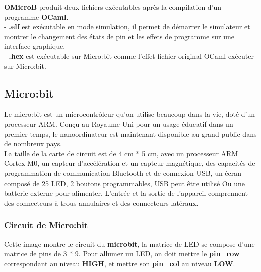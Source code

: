 \documentclass[14px]{article}
\begin{document}
	\textbf{OMicroB} produit deux fichiers exécutables après la compilation d'un programme \textbf{OCaml}.\\
	- \textbf{.elf} est exécutable en mode simulation, il permet de démarrer le simulateur et montrer le changement des états de pin et les effets de programme sur une interface graphique.\\
	- \textbf{.hex} est exécutable sur Micro:bit comme l'effet fichier original OCaml exécuter sur Micro:bit.
	
	\subsection{Micro:bit}
	Le micro:bit est un microcontrôleur qu'on utilise beaucoup dans la vie, doté d'un processeur ARM. Conçu au Royaume-Uni pour un usage éducatif dans un premier temps, le nanoordinateur est maintenant disponible au grand public dans de nombreux pays.\\
	
	La taille de la carte de circuit est de 4 cm * 5 cm, avec un processeur ARM Cortex-M0, un capteur d'accélération et un capteur magnétique, des capacités de programmation de communication Bluetooth et de connexion USB, un écran composé de 25 LED, 2 boutons programmables, USB peut être utilisé Ou une batterie externe pour alimenter. L'entrée et la sortie de l'appareil comprennent des connecteurs à trous annulaires et des connecteurs latéraux.
	
	\subsubsection{Circuit de Micro:bit}
	Cette image montre le circuit du \textbf{microbit}, la matrice de LED se compose d'une matrice de pins de 3 * 9. Pour allumer un LED, on doit mettre le \textbf{pin\_row} correspondant au niveau \textbf{HIGH}, et mettre son \textbf{pin\_col} au niveau \textbf{LOW}.
	\begin{figure}
	\end{figure}
	
\end{document}
